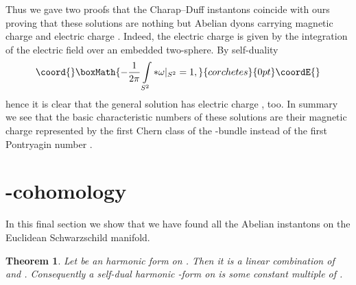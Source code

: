 \documentclass[a4paper,12pt,draft]{article}
\newtheorem{theorem}{Theorem}[section]
\begin{document}
 
Thus we gave two proofs that the Charap--Duff instantons coincide with 
ours proving that these solutions are nothing but Abelian dyons carrying
magnetic charge \coordHE{} and electric charge \coordHE{}. Indeed, the electric
charge is given by the integration of the electric field over an embedded
two-sphere. By self-duality
\[\coord{}\boxMath{-{1\over 2\pi}\int\limits_{S^2}*\omega\vert_{S^2}=1,}{corchetes}{0pt}\coordE{}\]
hence it is clear that the general solution has electric charge \coordHE{}, too. 
In summary we see that the basic
characteristic numbers of these solutions are their magnetic charge \coordHE{}
represented by the first Chern class of the \coordHE{}-bundle 
\coordHE{} instead of the
first Pontryagin number \coordHE{}. 

\section{\coordHE{}-cohomology}
In this final section we show that we have found all the Abelian
instantons on the Euclidean Schwarzschild manifold. 

\begin{theorem} Let \myHighlight{$\eta$}\coordHE{} be an \coordHE{} harmonic form on \coordHE{}. Then it is a 
linear combination of \myHighlight{$\dd \xi $}\coordHE{} and \myHighlight{$*\dd \xi$}\coordHE{}. Consequently a self-dual
\coordHE{} harmonic \coordHE{}-form on \coordHE{} is some constant multiple of 
\myHighlight{$\omega =\dd\xi + *\dd\xi$}\coordHE{}. 
\end{theorem}
\end{document}
